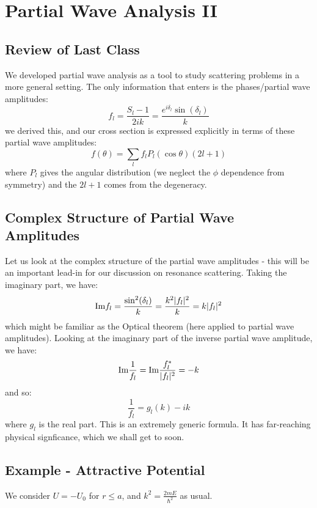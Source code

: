 \section{Partial Wave Analysis II}
\subsection{Review of Last Class}
We developed partial wave analysis as a tool to study scattering problems in a more general setting. The only information that enters is the phases/partial wave amplitudes:
\begin{equation}
    f_l = \frac{S_l - 1}{2ik} = \frac{e^{i\delta_l}\sin(\delta_l)}{k}
\end{equation}
we derived this, and our cross section is expressed explicitly in terms of these partial wave amplitudes:
\begin{equation}
    f(\theta) = \sum_l f_l P_l(\cos\theta)(2l+1)
\end{equation}
where $P_l$ gives the angular distribution (we neglect the $\phi$ dependence from symmetry) and the $2l+1$ comes from the degeneracy.

\subsection{Complex Structure of Partial Wave Amplitudes}
Let us look at the complex structure of the partial wave amplitudes - this will be an important lead-in for our discussion on resonance scattering. Taking the imaginary part, we have:
\begin{equation}
    \text{Im}f_l = \frac{\sin^2(\delta_l)}{k} = \frac{k^2\lvert f_l \rvert^2}{k} = k\lvert f_l \rvert^2
\end{equation}
which might be familiar as the Optical theorem (here applied to partial wave amplitudes). Looking at the imaginary part of the inverse partial wave amplitude, we have:
\begin{equation}
    \text{Im}\frac{1}{f_l} = \text{Im}\frac{f_l^*}{\lvert f_l \rvert^2} = -k
\end{equation}
and so:
\begin{equation}\label{eq-fl}
    \frac{1}{f_l} = g_l(k) - ik
\end{equation}
where $g_l$ is the real part. This is an extremely generic formula. It has far-reaching physical signficance, which we shall get to soon.

\subsection{Example - Attractive Potential}
We consider $U = -U_0$ for $r \leq a$, and $k^2 = \frac{2mE}{\hbar^2}$ as usual.


